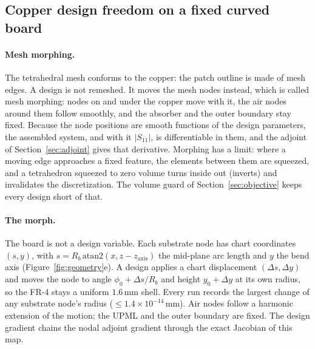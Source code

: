 \documentclass{anvil-paper}
\begin{document}
\subsection{Copper design freedom on a fixed curved board}
\label{sec:freedom}

\paragraph{Mesh morphing.}
The tetrahedral mesh conforms to the copper: the patch outline is made of
mesh edges. A design is not remeshed. It moves the mesh nodes instead, which is called mesh
morphing: nodes on and under the copper move with it, the air nodes around
them follow smoothly, and the absorber and the outer boundary stay fixed.
Because the node positions are smooth functions of the design parameters,
the assembled system, and with it $|S_{11}|$, is differentiable in them, and
the adjoint of Section~\ref{sec:adjoint} gives that derivative. Morphing has
a limit: where a moving edge approaches a fixed feature, the elements between
them are squeezed, and a tetrahedron squeezed to zero volume turns inside out
(inverts) and invalidates the discretization. The volume guard of
Section~\ref{sec:objective} keeps every design short of that.

\paragraph{The morph.}
The board is not a design variable. Each substrate node has chart
coordinates $(s, y)$, with $s = R_b\,\mathrm{atan2}(x, z - z_{\mathrm{axis}})$
the mid-plane arc length and $y$ the bend axis (Figure~\ref{fig:geometry}e). A design applies a chart
displacement $(\Delta s, \Delta y)$ and moves the node to angle
$\phi_0 + \Delta s/R_b$ and height $y_0 + \Delta y$ at its own radius, so
the FR-4 stays a uniform $1.6$\,mm shell. Every run records the largest
change of any substrate node's radius ($\le 1.4\times10^{-14}$\,mm). Air
nodes follow a harmonic extension of the motion; the UPML and the outer
boundary are fixed. The design gradient chains the nodal adjoint gradient
through the exact Jacobian of this map.
\end{document}
